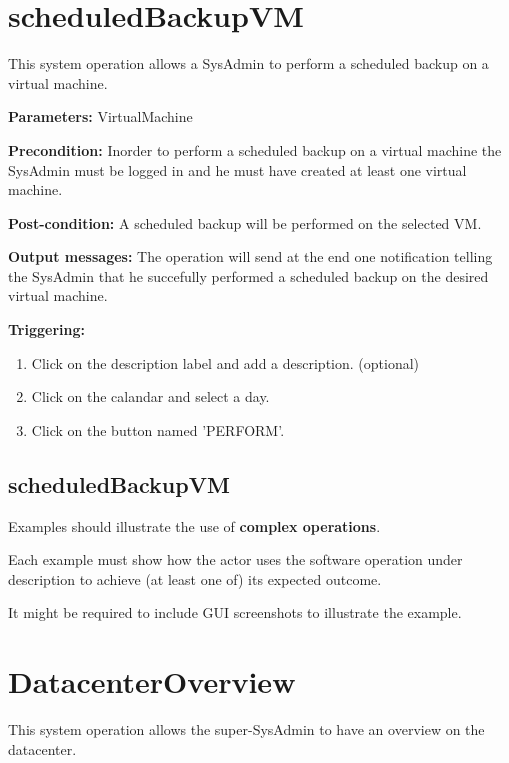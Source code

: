\section{scheduledBackupVM}
\label{operation:scheduledBackupVM}
This system operation allows a SysAdmin to perform a scheduled backup on a
virtual machine.
\begin{description}

\item \textbf{Parameters:} VirtualMachine
\item \textbf{Precondition:} Inorder to perform a scheduled backup on a virtual
machine the SysAdmin must be logged in and he must have created at least one
virtual machine.
\item \textbf{Post-condition:} A scheduled backup will be performed on the
selected VM.
\item \textbf{Output messages:} The operation will send at the end one
notification telling the SysAdmin that he succefully performed a scheduled
backup on the desired virtual machine.

\item \textbf{Triggering:}
\begin{enumerate}
\item Click on the description label and add a description. (optional)
\item Click on the calandar and select a day.
\item Click on the button named 'PERFORM'.
\end{enumerate}

 
\end{description}


\subsection{scheduledBackupVM}
Examples should illustrate the use of \textbf{complex operations}.

Each example must show how the actor uses the software operation under
description to achieve (at least one of) its expected outcome.

It might be required to include GUI screenshots to illustrate the example.






\section{DatacenterOverview}
\label{operation:datacenteroverview}
This system operation allows the super-SysAdmin to have an overview on the
datacenter.

